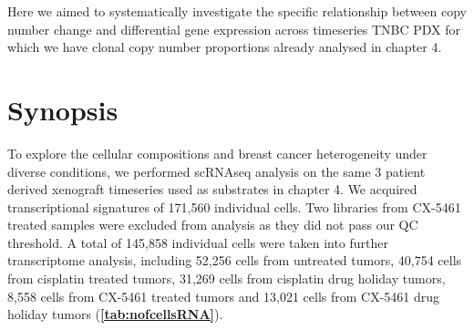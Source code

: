 Here we aimed to systematically investigate the specific relationship between copy number change and differential gene expression across timeseries TNBC PDX for which we have clonal copy number proportions already analysed in chapter 4. 




 \section{Synopsis}

 
To explore the cellular compositions and breast cancer heterogeneity under diverse conditions, we performed scRNAseq analysis on the same 3 patient derived xenograft timeseries used as substrates in chapter 4. We acquired transcriptional signatures of 171,560 individual cells. Two libraries from CX-5461 treated samples were excluded from analysis as they did not pass our QC threshold. A total of 145,858 individual cells were taken into further transcriptome analysis, including  52,256 cells from untreated tumors, 40,754 cells from cisplatin treated tumors, 31,269 cells from cisplatin drug holiday tumors, 8,558 cells from CX-5461 treated tumors and 13,021 cells from CX-5461 drug holiday tumors (\textbf{\autoref{tab:nofcellsRNA}}).

